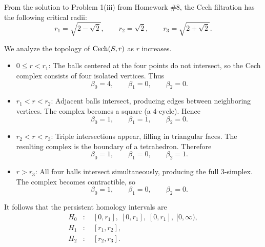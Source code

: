 \begin{solution}
  From the solution to Problem 1(iii) from Homework \#8, the Cech filtration has the following critical radii:
  \[%
    r_1 = \sqrt{2 - \sqrt{2}}, \qquad r_2 = \sqrt{2}, \qquad r_3 = \sqrt{2 + \sqrt{2}}
  .\]%

  We analyze the topology of $\operatorname{Cech}(S,r)$ as $r$ increases.

  \begin{itemize}
    \item \textbf{$0 \le r < r_1$}: The balls centered at the four points do not intersect, so the Cech complex consists of four isolated vertices. Thus
      \[%
        \beta_0 = 4, \qquad \beta_1 = 0, \qquad \beta_2 = 0
      .\]%
    \item \textbf{$r_1 < r < r_2$}: Adjacent balls intersect, producing edges between neighboring vertices. The complex becomes a square (a $4$-cycle). Hence
      \[%
        \beta_0 = 1, \qquad \beta_1 = 1, \qquad \beta_2 = 0
      .\]%
    \item \textbf{$r_2 < r < r_3$}: Triple intersections appear, filling in triangular faces. The resulting complex is the boundary of a tetrahedron. Therefore
      \[%
        \beta_0 = 1, \qquad \beta_1 = 0, \qquad \beta_2 = 1
      .\]%
    \item \textbf{$r > r_3$}: All four balls intersect simultaneously, producing the full $3$-simplex. The complex becomes contractible, so
      \[%
        \beta_0 = 1, \qquad \beta_1 = 0, \qquad \beta_2 = 0
      .\]%
  \end{itemize}

  It follows that the persistent homology intervals are
  \begin{align*}
    H_0 &: \quad [0,r_1],\; [0,r_1],\; [0,r_1],\; [0,\infty), \\
    H_1 &: \quad [r_1,r_2], \\
    H_2 &: \quad [r_2,r_3].
  \end{align*}

  \begin{figure}[H]
    \centering

    \begin{subfigure}{0.45\textwidth}
      \centering
\end{subfigure}
\end{figure}
\end{solution}
